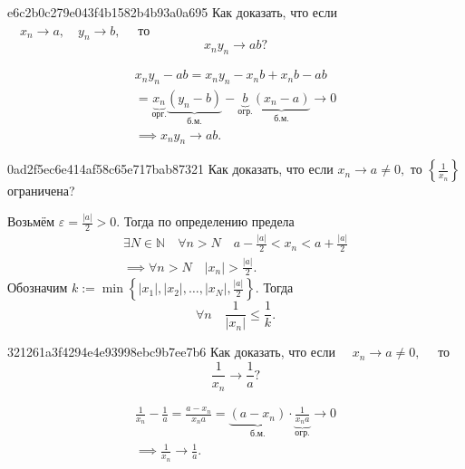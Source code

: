     \begin{note}{e6c2b0c279e043f4b1582b4b93a0a695}
        Как доказать, что если \( \quad x_n \to a, \quad y_n \to b, \quad \) то \[
            x_n y_n \to ab?
        \]

        \begin{cloze}{1}
            \begin{multline*}
                x_n y_n - ab = x_n y_n - x_n b + x_n b - ab \\
                = \underbrace{x_n}_{\text{орг.}} \underbrace{(y_n -
                b)}_{\text{б.м.}} - \underbrace{b}_{\text{огр.}}
                \underbrace{(x_n - a)}_{\text{б.м.}} \longrightarrow 0 \\
                \implies x_n y_n \to ab.
            \end{multline*}
        \end{cloze}
    \end{note}

    \begin{note}{0ad2f5ec6e414af58c65e717bab87321}
        Как доказать, что если \( x_n \to a \neq 0,  \) то \( \left\{ \frac{1}{x_n} \right\} \) ограничена?

        \begin{cloze}{1}
            Возьмём \( \varepsilon = \frac{|a|}{2} > 0. \) Тогда по определению предела
            \begin{multline*}
                \exists N \in \mathbb N \quad \forall n > N \quad a - \frac{|a|}{2} < x_n < a + \frac{|a|}{2} \\
                \implies \forall n > N \quad |x_n| > \frac{|a|}{2}.
            \end{multline*}
            Обозначим \( k := \min \left\{ |x_1|, |x_2|, \ldots, |x_N|, \frac{|a|}{2} \right\}. \) Тогда \[
                \forall n \quad \frac{1}{|x_n|} \leqslant \frac{1}{k}.
            \]
        \end{cloze}
    \end{note}

    \begin{note}{321261a3f4294e4e93998ebc9b7ee7b6}
        Как доказать, что если \( \quad x_n \to a \neq 0, \quad \) то \[
            \frac{1}{x_n} \to \frac{1}{a}?
        \]

        \begin{cloze}{1}
            \begin{multline*}
                \frac{1}{x_n} - \frac{1}{a} = \frac{a - x_n}{x_n a} =
                \underbrace{(a - x_n)}_{\text{б.м.} }  \cdot
                \underbrace{\frac{1}{x_n a}}_{\text{огр.} } \to 0 \\
                \implies \frac{1}{x_n} \to \frac{1}{a}.
            \end{multline*}
        \end{cloze}
    \end{note}

